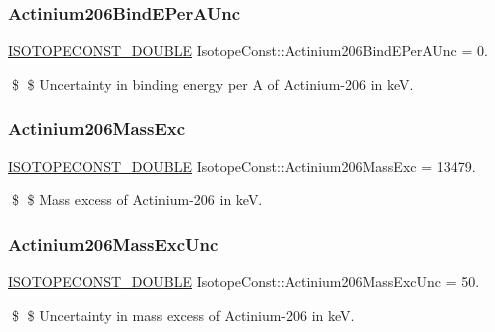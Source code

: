 \subsubsection{\texorpdfstring{Actinium206\+Bind\+E\+Per\+A\+Unc}{Actinium206BindEPerAUnc}}
{\footnotesize\ttfamily \mbox{\hyperlink{group___isotope_const-_macros_ga8f45a7272ce02c0b4c65c44636ed719a}{I\+S\+O\+T\+O\+P\+E\+C\+O\+N\+S\+T\+\_\+\+D\+O\+U\+B\+LE}} Isotope\+Const\+::\+Actinium206\+Bind\+E\+Per\+A\+Unc = 0.}

\$ \$ Uncertainty in binding energy per A of Actinium-\/206 in keV. \mbox{\label{group___isotope_const-_actinium-_ac206_gaa58d395495db8243baaaaba35ad0132d}} 
\subsubsection{\texorpdfstring{Actinium206\+Mass\+Exc}{Actinium206MassExc}}
{\footnotesize\ttfamily \mbox{\hyperlink{group___isotope_const-_macros_ga8f45a7272ce02c0b4c65c44636ed719a}{I\+S\+O\+T\+O\+P\+E\+C\+O\+N\+S\+T\+\_\+\+D\+O\+U\+B\+LE}} Isotope\+Const\+::\+Actinium206\+Mass\+Exc = 13479.}

\$ \$ Mass excess of Actinium-\/206 in keV. \mbox{\label{group___isotope_const-_actinium-_ac206_ga499d29d74c70734d34299cae81883048}} 
\subsubsection{\texorpdfstring{Actinium206\+Mass\+Exc\+Unc}{Actinium206MassExcUnc}}
{\footnotesize\ttfamily \mbox{\hyperlink{group___isotope_const-_macros_ga8f45a7272ce02c0b4c65c44636ed719a}{I\+S\+O\+T\+O\+P\+E\+C\+O\+N\+S\+T\+\_\+\+D\+O\+U\+B\+LE}} Isotope\+Const\+::\+Actinium206\+Mass\+Exc\+Unc = 50.}

\$ \$ Uncertainty in mass excess of Actinium-\/206 in keV. \mbox{\label{group___isotope_const-_actinium-_ac206_ga9f2a725294a8c5a71b5d64b554532da0}} 
